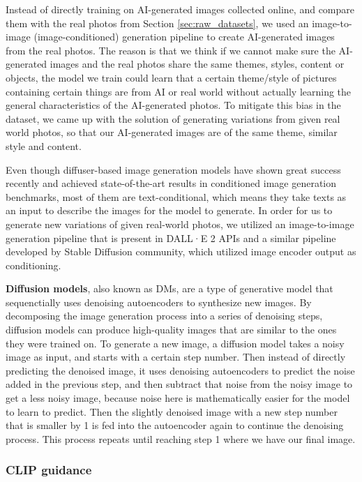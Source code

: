 \documentclass[11pt]{article}
\begin{document}
Instead of directly training on AI-generated images collected online, and compare them with the real photos from Section \ref{sec:raw_datasets}, we used an image-to-image (image-conditioned) generation pipeline to create AI-generated images from the real photos. The reason is that we think if we cannot make sure the AI-generated images and the real photos share the same themes, styles, content or objects, the model we train could learn that a certain theme/style of pictures containing certain things are from AI or real world without actually learning the general characteristics of the AI-generated photos. To mitigate this bias in the dataset, we came up with the solution of generating variations from given real world photos, so that our AI-generated images are of the same theme, similar style and content.

Even though diffuser-based image generation models have shown great success recently and achieved state-of-the-art results in conditioned image generation benchmarks, most of them are text-conditional, which means they take texts as an input to describe the images for the model to generate. In order for us to generate new variations of given real-world photos, we utilized an image-to-image generation pipeline that is present in DALL·E 2 APIs and a similar pipeline developed by Stable Diffusion community, which utilized image encoder output as conditioning.

\textbf{Diffusion models}, also known as DMs, are a type of generative model that sequenctially uses denoising autoencoders to synthesize new images. By decomposing the image generation process into a series of denoising steps, diffusion models can produce high-quality images that are similar to the ones they were trained on. To generate a new image, a diffusion model takes a noisy image as input, and starts with a certain step number. Then instead of directly predicting the denoised image, it uses denoising autoencoders to predict the noise added in the previous step, and then subtract that noise from the noisy image to get a less noisy image, because noise here is mathematically easier for the model to learn to predict. Then the slightly denoised image with a new step number that is smaller by 1 is fed into the autoencoder again to continue the denoising process. This process repeats until reaching step 1 where we have our final image.

\subsubsection{CLIP guidance}
\end{document}
